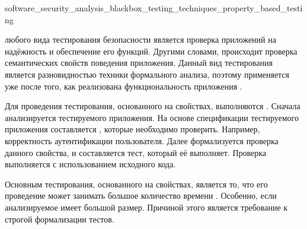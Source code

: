 
	{software_security_analysis_blackbox_testing_techniques_property_based_testing}

%
 любого вида тестирования безопасности является проверка приложений на надёжность и обеспечение его функций. 
%
Другими словами, происходит проверка семантических свойств поведения приложения. 
%
Данный вид тестирования является разновидностью техники формального анализа, поэтому применяется уже после того, как реализована функциональность приложения .

%
Для проведения тестирования, основанного на свойствах, выполняются  
. 
%
Сначала анализируется  тестируемого приложения. 
%
На основе спецификации тестируемого приложения составляется , которые необходимо проверить. 
%
Например, корректность аутентификации пользователя. 
%
Далее формализуется проверка данного свойства, и составляется тест, который её выполняет. 
%
Проверка выполняется с использованием исходного кода.

%
Основным  тестирования, основанного на свойствах, является то, что его проведение может занимать большое количество времени . 
%
Особенно, если анализируемое  имеет большой размер. 
%
Причиной этого является требование к строгой формализации тестов.